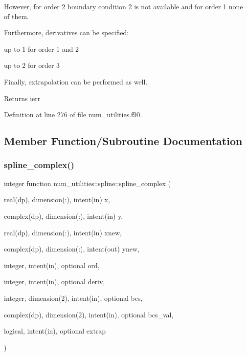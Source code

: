 However, for order 2 boundary condition 2 is not available and for order 1 none of them.

Furthermore, derivatives can be specified\+:
\begin{DoxyItemize}
\item up to 1 for order 1 and 2
\item up to 2 for order 3
\end{DoxyItemize}

Finally, extrapolation can be performed as well.

\begin{DoxyReturn}{Returns}
ierr 
\end{DoxyReturn}


Definition at line 276 of file num\+\_\+utilities.\+f90.



\subsection{Member Function/\+Subroutine Documentation}
\mbox{\label{interfacenum__utilities_1_1spline_a02b3cc0c51d11a9b5d889f871e2d088f}} 
\subsubsection{\texorpdfstring{spline\+\_\+complex()}{spline\_complex()}}
{\footnotesize\ttfamily integer function num\+\_\+utilities\+::spline\+::spline\+\_\+complex (\begin{DoxyParamCaption}\item[{real(dp), dimension(\+:), intent(in)}]{x,  }\item[{complex(dp), dimension(\+:), intent(in)}]{y,  }\item[{real(dp), dimension(\+:), intent(in)}]{xnew,  }\item[{complex(dp), dimension(\+:), intent(out)}]{ynew,  }\item[{integer, intent(in), optional}]{ord,  }\item[{integer, intent(in), optional}]{deriv,  }\item[{integer, dimension(2), intent(in), optional}]{bcs,  }\item[{complex(dp), dimension(2), intent(in), optional}]{bcs\+\_\+val,  }\item[{logical, intent(in), optional}]{extrap }\end{DoxyParamCaption})}



